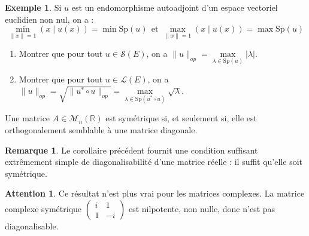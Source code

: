 \documentclass[french]{article}
\newcommand{\R}{\mathbb{R}}
\newcommand{\st}{^*}
\theoremstyle{plain}
\theoremstyle{definition}
\newtheorem*{ex}{Exemple}
\newtheorem*{rmq}{Remarque}
\newtheorem*{attention}{Attention}
\theoremstyle{remark}
\begin{document}
\begin{ex}
	Si $u$ est un endomorphisme autoadjoint d'un espace vectoriel euclidien non nul, on a : $$\underset{\lVert x\rVert=1}{\min}(x\mid u(x))=\min\text{Sp}(u)\ \ \text{et}\ \ \underset{\lVert x\rVert=1}{\max}(x\mid u(x))=\max\text{Sp}(u)$$
\end{ex}

\begin{exo}
	\begin{enumerate}
		\item Montrer que pour tout $u\in\mathcal{S}(E)$, on a $\lVert u\rVert_{op}=\displaystyle\underset{\lambda\in\text{Sp}(u)}{\max}\lvert\lambda\rvert$.
		\item Montrer que pour tout $u\in\mathcal{L}(E)$, on a $\lVert u\rVert_{op}=\sqrt{\lVert u\st\circ u\rVert_{op}}=\displaystyle\underset{\lambda\in\text{Sp}(u\st\circ u)}{\max}\sqrt{\lambda}$.
	\end{enumerate}
\end{exo}

\begin{cor}
	Une matrice $A\in\mathcal{M}_n(\R)$ est symétrique si, et seulement si, elle est orthogonalement semblable à une matrice diagonale.
\end{cor}

\begin{rmq}
	Le corollaire précédent fournit une condition suffisant extrêmement simple de diagonalisabilité d'une matrice réelle : il suffit qu'elle soit symétrique.
\end{rmq}

\begin{attention}
	Ce résultat n'est plus vrai pour les matrices complexes. La matrice complexe symétrique $\displaystyle\begin{pmatrix}
	i&1\\
	1&-i
\end{pmatrix}$ est nilpotente, non nulle, donc n'est pas diagonalisable.
\end{attention}
\end{document}
